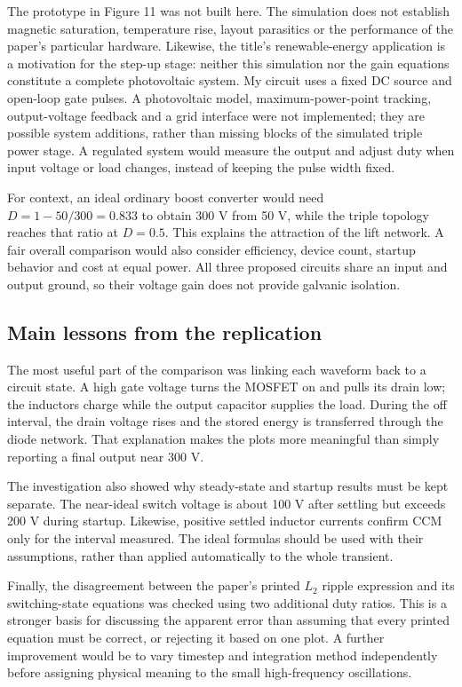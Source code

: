 \documentclass[11pt,a4paper]{article}
\begin{document}
The prototype in Figure 11 was not built here. The simulation does not establish magnetic saturation, temperature rise, layout parasitics or the performance of the paper's particular hardware. Likewise, the title's renewable-energy application is a motivation for the step-up stage: neither this simulation nor the gain equations constitute a complete photovoltaic system. My circuit uses a fixed DC source and open-loop gate pulses. A photovoltaic model, maximum-power-point tracking, output-voltage feedback and a grid interface were not implemented; they are possible system additions, rather than missing blocks of the simulated triple power stage. A regulated system would measure the output and adjust duty when input voltage or load changes, instead of keeping the pulse width fixed.

For context, an ideal ordinary boost converter would need $D=1-50/300=0.833$ to obtain 300 V from 50 V, while the triple topology reaches that ratio at $D=0.5$. This explains the attraction of the lift network. A fair overall comparison would also consider efficiency, device count, startup behavior and cost at equal power. All three proposed circuits share an input and output ground, so their voltage gain does not provide galvanic isolation.

\subsection{Main lessons from the replication}
The most useful part of the comparison was linking each waveform back to a circuit state. A high gate voltage turns the MOSFET on and pulls its drain low; the inductors charge while the output capacitor supplies the load. During the off interval, the drain voltage rises and the stored energy is transferred through the diode network. That explanation makes the plots more meaningful than simply reporting a final output near 300 V.

The investigation also showed why steady-state and startup results must be kept separate. The near-ideal switch voltage is about 100 V after settling but exceeds 200 V during startup. Likewise, positive settled inductor currents confirm CCM only for the interval measured. The ideal formulas should be used with their assumptions, rather than applied automatically to the whole transient.

Finally, the disagreement between the paper's printed $L_2$ ripple expression and its switching-state equations was checked using two additional duty ratios. This is a stronger basis for discussing the apparent error than assuming that every printed equation must be correct, or rejecting it based on one plot. A further improvement would be to vary timestep and integration method independently before assigning physical meaning to the small high-frequency oscillations.
\clearpage
\end{document}

